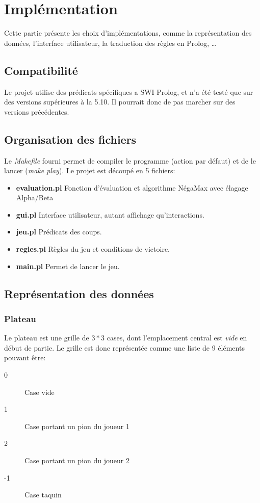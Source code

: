 \documentclass[a4paper,12pt]{article}
\begin{document}
\section{Implémentation}
Cette partie présente les choix d'implémentations, comme la représentation des données, l'interface utilisateur,
la traduction des règles en Prolog, \dots

\subsection{Compatibilité}
Le projet utilise des prédicats spécifiques a SWI-Prolog, et n'a été testé que sur des versions supérieures à la 5.10. Il pourrait donc de pas marcher sur des versions précédentes.

\subsection{Organisation des fichiers}
Le \emph{Makefile} fourni permet de compiler le programme (action par défaut) et de le lancer (\emph{make play}). Le projet est découpé en 5 fichiers:
  \begin{itemize}
    \item \textbf{evaluation.pl} Fonction d'évaluation et algorithme NégaMax avec élagage Alpha/Beta
    \item \textbf{gui.pl} Interface utilisateur, autant affichage qu'interactions.
    \item \textbf{jeu.pl} Prédicats des coups.
    \item \textbf{regles.pl} Règles du jeu et conditions de victoire.
    \item \textbf{main.pl} Permet de lancer le jeu.
  \end{itemize}

\subsection{Représentation des données}
\subsubsection{Plateau}
Le plateau est une grille de $3 * 3$ cases, dont l'emplacement central est \emph{vide} en début de partie.
Le grille est donc représentée comme une liste de 9 éléments pouvant être:
  \begin{description}
    \item[0]  Case vide
    \item[1]  Case portant un pion du joueur 1
    \item[2]  Case portant un pion du joueur 2
    \item[-1] Case taquin
  \end{description}
  
\end{document}
